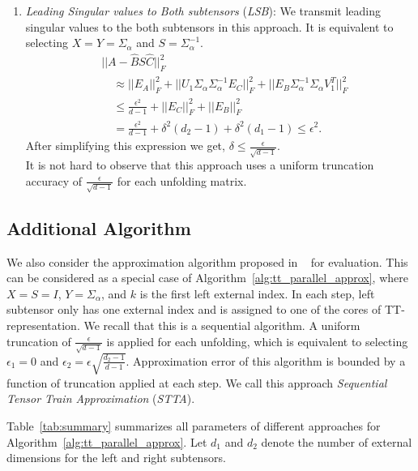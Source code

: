 \documentclass[runningheads]{llncs}
\newcommand{\hthird}{{\it LSB}\xspace}
\newcommand{\otta}{{\it STTA}\xspace}
\begin{document}
\begin{enumerate}
	\item \textit{Leading Singular values to Both subtensors} (\hthird): We transmit leading singular values to the both subtensors in this approach. It is equivalent to selecting $X=Y=\Sigma_\alpha$ and $S=\Sigma_\alpha^{-1}$.
	\begin{align*}
	&||A - \hat{B} S \hat{C}||_F^2\\
	&\quad\approx ||E_A||_F^2 + ||U_1\Sigma_\alpha \Sigma_\alpha^{-1} E_C||_F^2 + ||E_B \Sigma_\alpha^{-1} \Sigma_\alpha V_1^T||_F^2\\
	&\quad\le \frac{\epsilon^2}{d-1} + ||E_C||_F^2 + ||E_B||_F^2 \\
	&\quad= \frac{\epsilon^2}{d-1} + \delta^2 (d_2 -1) + \delta^2 (d_1-1) \le \epsilon^2.
	\end{align*}
	\noindent After simplifying this expression we get, $\delta \le \frac{\epsilon}{\sqrt{d-1}}$.\\
	It is not hard to observe that this approach uses a uniform truncation accuracy of $\frac{\epsilon}{\sqrt{d-1}}$ for each unfolding matrix.	
\end{enumerate}

\subsection{Additional Algorithm}
We also consider the approximation algorithm proposed in ~\cite{tt} for evaluation. This can be considered as a special case of Algorithm~\ref{alg:tt_parallel_approx}, where $X=S=I$, $Y=\Sigma_\alpha$, and $k$ is the first left external index. In each step, left subtensor only has one external index and is assigned to one of the cores of TT-representation. We recall that this is a sequential algorithm. A uniform truncation of $\frac{\epsilon}{\sqrt{d-1}}$ is applied for each unfolding, which is equivalent to selecting $\epsilon_1=0$ and $\epsilon_2=\epsilon\sqrt{\frac{d_2-1}{d-1}}$. Approximation error of this algorithm is bounded by a function of truncation applied at each step.
We call this approach \textit{Sequential Tensor Train Approximation} (\otta).

\medskip

Table~\ref{tab:summary} summarizes all parameters of different approaches for Algorithm~\ref{alg:tt_parallel_approx}. Let $d_1$ and $d_2$ denote the number of external dimensions for the left and right subtensors.
\end{document}
